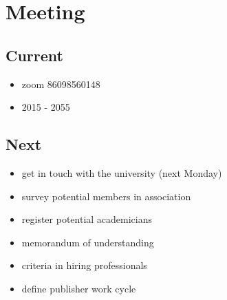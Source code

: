 \documentclass{beamer}
\begin{document}
\section{Meeting}

\subsection{Current}
\begin{frame}
  \begin{itemize}
    \item zoom 86098560148
    \item 2015 - 2055
  \end{itemize}
\end{frame}


\subsection{Next}
\begin{frame}
  \begin{itemize}
    \item get in touch with the university (next Monday)
    \item survey potential members in association
    \item register potential academicians
    \item memorandum of understanding
    \item criteria in hiring professionals
    \item define publisher work cycle
  \end{itemize}
\end{frame}
\end{document}
